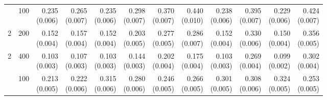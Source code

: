 \begin{table}[p]
{\begin{tabular}{llrrrrrrrrrr}
\addlinespace
2 & 100 & \shortstack{0.235\\(0.006)} & \shortstack{0.265\\(0.007)} & \shortstack{0.235\\(0.006)} & \shortstack{0.298\\(0.007)} & \shortstack{0.370\\(0.007)} & \shortstack{0.440\\(0.010)} & \shortstack{0.238\\(0.006)} & \shortstack{0.395\\(0.007)} & \shortstack{0.229\\(0.006)} & \shortstack{0.424\\(0.007)} \\
2 & 200 & \shortstack{0.152\\(0.004)} & \shortstack{0.157\\(0.004)} & \shortstack{0.152\\(0.004)} & \shortstack{0.203\\(0.005)} & \shortstack{0.277\\(0.005)} & \shortstack{0.286\\(0.007)} & \shortstack{0.152\\(0.004)} & \shortstack{0.330\\(0.006)} & \shortstack{0.150\\(0.004)} & \shortstack{0.356\\(0.005)} \\
2 & 400 & \shortstack{0.103\\(0.003)} & \shortstack{0.107\\(0.003)} & \shortstack{0.103\\(0.003)} & \shortstack{0.144\\(0.003)} & \shortstack{0.202\\(0.004)} & \shortstack{0.175\\(0.004)} & \shortstack{0.103\\(0.003)} & \shortstack{0.269\\(0.004)} & \shortstack{0.099\\(0.002)} & \shortstack{0.302\\(0.004)} \\
\addlinespace
3 & 100 & \shortstack{0.213\\(0.005)} & \shortstack{0.222\\(0.006)} & \shortstack{0.315\\(0.006)} & \shortstack{0.280\\(0.006)} & \shortstack{0.246\\(0.005)} & \shortstack{0.266\\(0.005)} & \shortstack{0.301\\(0.005)} & \shortstack{0.308\\(0.006)} & \shortstack{0.324\\(0.005)} & \shortstack{0.253\\(0.005)} \\

\end{tabular}}
\end{table}

